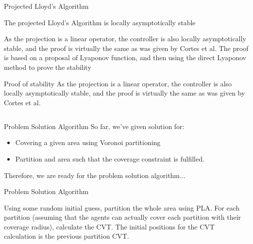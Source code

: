 \documentclass[t]{beamer}
\begin{document}
\begin{frame}[label=projlloydsalgotheorem]{Projected Lloyd's Algorithm}
\begin{theorem}
The projected Lloyd's Algorithm is locally asymptotically stable
\end{theorem}

As the projection is a linear operator, the controller is also locally asymptotically stable, and the proof is virtually the same as was given by Cortes et al. The proof is based on a proposal of Lyaponov function, and then using the direct Lyaponov method to prove the stability
\end{frame}

\begin{frame}[label=projlloydsalgoproof]{Proof of stability}
As the projection is a linear operator, the controller is also locally asymptotically stable, and the proof is virtually the same as was given by Cortes et al.\\

\end{frame}

\subsection[Problem Solution Algorithm]{}
\begin{frame}[label=probsolalg1]{Problem Solution Algorithm}
So far, we've given solution for:
\begin{itemize}
\item Covering a given area using Voronoi partitioning
\item Partition and area such that the coverage constraint is fulfilled.
\end{itemize}

Therefore, we are ready for the problem solution algorithm...
\end{frame}

\begin{frame}[label=probsolalg2]{Problem Solution Algorithm}
\begin{algorithm}[H]
\caption{Problem Solution Algorithm}\label{GeneralProbSolution}
\begin{algorithmic}[1]
\State Using some random initial guess, partition the whole area using PLA.
\State For each partition (assuming that the agents can actually cover each partition with their coverage radius), calculate the CVT. The initial positions for the CVT calculation is the previous partition CVT.
\end{algorithmic}
\end{algorithm}
\end{frame}
\end{document}
